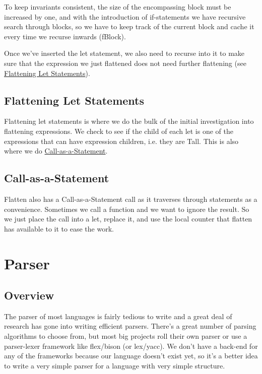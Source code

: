 \documentclass[journal=jacsat, manuscript=article]{achemso}
\begin{document}
To keep invariants consistent, the size of the encompassing block must be increased by one,
and with the introduction of if-statements we have recursive search through blocks, so we
have to keep track of the current block and cache it every time we recurse inwards
(fBlock).

Once we've inserted the let statement, we also need to recurse into it to make sure that
the expression we just flattened does not need further flattening 
(see \hyperref[sec:Flattening Let Statements]{Flattening Let Statements}).

\subsection{Flattening Let Statements}

Flattening let statements is where we do the bulk of the initial investigation into flattening
expressions. We check to see if the child of each let is one of the expressions that can have
expression children, i.e. they are Tall. This is also where we do \hyperref[sec:Call-as-a-Statement]{Call-as-a-Statement}.

\subsection{Call-as-a-Statement}

Flatten also has a Call-as-a-Statement call as it traverses through statements as a
convenience. Sometimes we call a function and we want to ignore the result. So we just
place the call into a let, replace it, and use the local counter that flatten has available to
it to ease the work.

\section{Parser}

\subsection{Overview}

The parser of most languages is fairly tedious to write and a great deal of research has
gone into writing efficient parsers. There's a great number of parsing algorithms to choose
from, but most big projects roll their own parser or use a parser-lexer framework like
flex/bison (or lex/yacc). We don't have a back-end for any of the frameworks because our
language doesn't exist yet, so it's a better idea to write a very simple parser for a language
with very simple structure.
\end{document}

